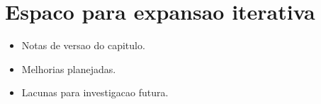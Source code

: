 \section{Espaco para expansao iterativa}
\begin{itemize}[leftmargin=*]
  \item Notas de versao do capitulo.
  \item Melhorias planejadas.
  \item Lacunas para investigacao futura.
\end{itemize}
